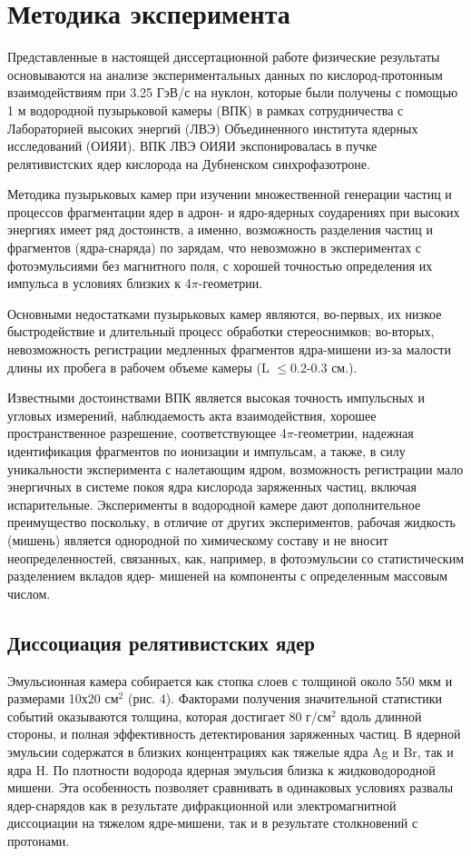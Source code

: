 \documentclass[fontsize=14pt]{scrarticle}
\begin{document}
\section{Методика эксперимента}
\hspace{0.6cm}
Представленные в настоящей диссертационной работе физические
результаты основываются на анализе экспериментальных данных по
кислород-протонным взаимодействиям при 3.25 ГэВ/с на нуклон, которые
были получены с помощью 1 м водородной пузырьковой камеры (ВПК) в
рамках сотрудничества с Лабораторией высоких энергий (ЛВЭ)
Объединенного института ядерных исследований (ОИЯИ). ВПК ЛВЭ ОИЯИ
экспонировалась в пучке релятивистских ядер кислорода на Дубненском
синхрофазотроне.

Методика пузырьковых камер при изучении множественной генерации
частиц и процессов фрагментации ядер в адрон- и ядро-ядерных соударениях при высоких энергиях имеет ряд достоинств, а именно, возможность разделения частиц и фрагментов (ядра-снаряда) по зарядам, что невозможно в экспериментах с фотоэмульсиями без магнитного поля, с хорошей точностью определения их импульса в условиях близких к 4$\pi$-геометрии.

Основными недостатками пузырьковых камер являются, во-первых, их
низкое быстродействие и длительный процесс обработки стереоснимков; во-вторых, невозможность регистрации медленных фрагментов ядра-мишени
из-за малости длины их пробега в рабочем объеме камеры (L $\le$0.2-0.3 см.).

Известными достоинствами ВПК является высокая точность импульсных и угловых измерений, наблюдаемость акта взаимодействия, хорошее пространственное разрешение, соответствующее 4$\pi$-геометрии, надежная идентификация фрагментов по ионизации и импульсам, а также, в силу уникальности эксперимента с налетающим ядром, возможность
регистрации мало энергичных в системе покоя ядра кислорода заряженных
частиц, включая испарительные. Эксперименты в водородной камере дают
дополнительное преимущество поскольку, в отличие от других
экспериментов, рабочая жидкость (мишень) является однородной по
химическому составу и не вносит неопределенностей, связанных, как,
например, в фотоэмульсии со статистическим разделением вкладов ядер-
мишеней на компоненты с определенным массовым числом.
\subsection{Диссоциация релятивистских ядер}
\hspace{0.6cm}
Эмульсионная камера собирается как стопка слоев с толщиной около 550 мкм и размерами 10х20 см$^{2}$ (рис. 4). Факторами получения значительной статистики событий оказываются толщина, которая достигает 80 г/см$^{2}$ вдоль длинной стороны, и полная эффективность детектирования заряженных частиц. В ядерной эмульсии содержатся в близких концентрациях как тяжелые ядра Ag и Br, так и ядра H. По плотности водорода ядерная эмульсия близка к жидководородной мишени. Эта особенность позволяет сравнивать в одинаковых условиях развалы ядер-снарядов как в результате дифракционной или электромагнитной диссоциации на тяжелом ядре-мишени, так и в результате столкновений с протонами. 
\end{document}
